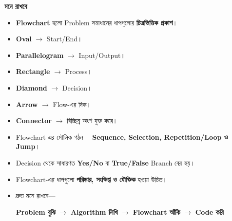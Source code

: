 \begin{rememberbox}

\textbf{\color{deepOrange}মনে রাখবে}

\begin{itemize}

\item
\textbf{Flowchart} হলো Problem সমাধানের ধাপগুলোর
\textbf{চিত্রভিত্তিক প্রকাশ}।

\item
\textbf{Oval}
\(\rightarrow\)
Start/End।

\item
\textbf{Parallelogram}
\(\rightarrow\)
Input/Output।

\item
\textbf{Rectangle}
\(\rightarrow\)
Process।

\item
\textbf{Diamond}
\(\rightarrow\)
Decision।

\item
\textbf{Arrow}
\(\rightarrow\)
Flow-এর দিক।

\item
\textbf{Connector}
\(\rightarrow\)
বিচ্ছিন্ন অংশ যুক্ত করে।

\item
Flowchart-এর মৌলিক গঠন—
\textbf{Sequence, Selection, Repetition/Loop ও Jump}।

\item
Decision থেকে সাধারণত
\textbf{Yes/No}
বা
\textbf{True/False}
Branch বের হয়।

\item
Flowchart-এর ধাপগুলো
\textbf{পরিষ্কার, সংক্ষিপ্ত ও যৌক্তিক} হওয়া উচিত।

\item
দ্রুত মনে রাখবে—

\begin{center}

\textbf{Problem বুঝি}
\(\longrightarrow\)
\textbf{Algorithm লিখি}
\(\longrightarrow\)
\textbf{Flowchart আঁকি}
\(\longrightarrow\)
\textbf{Code করি}

\end{center}

\end{itemize}

\end{rememberbox}

\small


